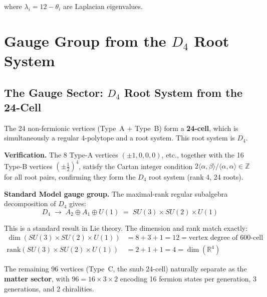 \documentclass[12pt,a4paper]{article}
\begin{document}
where $\lambda_i = 12 - \theta_i$ are Laplacian eigenvalues.


\section{Gauge Group from the $D_4$ Root System}

\subsection{The Gauge Sector: $D_4$ Root System from the 24-Cell}
\label{sec:gauge}

The 24 non-fermionic vertices (Type~A + Type~B) form a \textbf{24-cell}, which is simultaneously a regular 4-polytope and a root system. This root system is $D_4$.

\textbf{Verification.} The 8 Type-A vertices $(\pm 1, 0, 0, 0)$, etc., together with the 16 Type-B vertices $(\pm\tfrac{1}{2})^4$, satisfy the Cartan integer condition $2\langle \alpha, \beta\rangle / \langle \alpha, \alpha\rangle \in \mathbb{Z}$ for all root pairs, confirming they form the $D_4$ root system (rank 4, 24 roots).

\textbf{Standard Model gauge group.} The maximal-rank regular subalgebra decomposition of $D_4$ gives:
\begin{equation}
\boxed{D_4 \;\to\; A_2 \oplus A_1 \oplus U(1) \;=\; SU(3) \times SU(2) \times U(1)}
\end{equation}

This is a standard result in Lie theory. The dimension and rank match exactly:
\begin{align}
\dim(SU(3) \times SU(2) \times U(1)) &= 8 + 3 + 1 = 12 = \text{vertex degree of 600-cell} \\
\mathrm{rank}(SU(3) \times SU(2) \times U(1)) &= 2 + 1 + 1 = 4 = \dim(\mathbb{R}^4)
\end{align}

The remaining 96 vertices (Type~C, the snub 24-cell) naturally separate as the \textbf{matter sector}, with $96 = 16 \times 3 \times 2$ encoding 16 fermion states per generation, 3 generations, and 2 chiralities.
\end{document}
